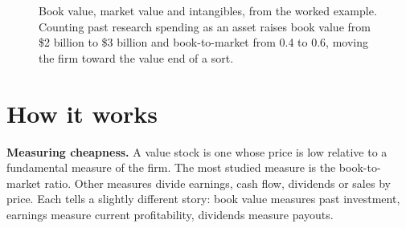 \begin{figure}[!htbp]
  \centering
\caption{Book value, market value and intangibles, from the worked example. Counting past research spending as an asset raises book value from \$2 billion to \$3 billion and book-to-market from 0.4 to 0.6, moving the firm toward the value end of a sort.}
\label{fig:08-book}
\end{figure}

\section{How it works}
\label{sec:08-how}

\textbf{Measuring cheapness.} A value stock is one whose price is low relative to a fundamental measure of the firm. The most studied measure is the book-to-market ratio. Other measures divide earnings, cash flow, dividends or sales by price. Each tells a slightly different story: book value measures past investment, earnings measure current profitability, dividends measure payouts.


